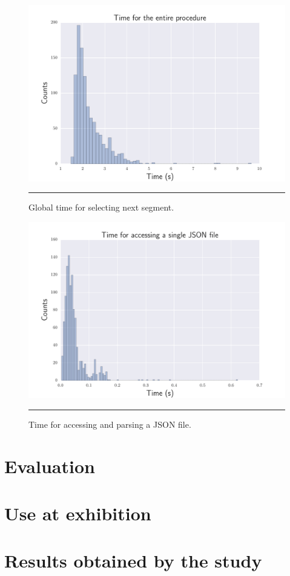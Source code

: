 \begin{figure}[h]
\begin{center}
\includegraphics[scale=0.7]{Figures/bench_procedure.pdf}
    \rule{10em}{0.5pt}
  \caption[Global time for selecting next segment]{Global time for selecting next segment.}
  \label{fig:step7}
\end{center}
\end{figure}

\begin{figure}[h]
\begin{center}
\includegraphics[scale=0.7]{Figures/bench_json_single.pdf}
    \rule{10em}{0.5pt}
  \caption[Time for accessing and parsing a JSON file]{Time for accessing and parsing a JSON file.}
  \label{fig:step8}
\end{center}
\end{figure}






\section{Evaluation}
\section{Use at exhibition} 
\section{Results obtained by the study}